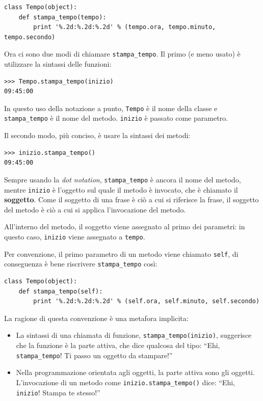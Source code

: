 \documentclass[10pt]{book}
\begin{document}
\begin{verbatim}
class Tempo(object):
    def stampa_tempo(tempo):
        print '%.2d:%.2d:%.2d' % (tempo.ora, tempo.minuto, tempo.secondo)
\end{verbatim}
%
Ora ci sono due modi di chiamare \verb"stampa_tempo".  Il primo (e meno usato) è utilizzare la sintassi delle funzioni:


\begin{verbatim}
>>> Tempo.stampa_tempo(inizio)
09:45:00
\end{verbatim}
%
In questo uso della notazione a punto, {\tt Tempo} è il nome della classe e
 \verb"stampa_tempo" è il nome del metodo.  {\tt inizio} è passato come parametro.

Il secondo modo, più conciso, è usare la sintassi dei metodi:

\begin{verbatim}
>>> inizio.stampa_tempo()
09:45:00
\end{verbatim}
%
Sempre usando la {\em dot notation}, \verb"stampa_tempo" è ancora il nome del metodo, mentre {\tt inizio} è l'oggetto sul quale il metodo è invocato, che è chiamato il {\bf soggetto}.  Come il soggetto di una frase è ciò a cui si riferisce la frase, il soggetto del metodo è ciò a cui si applica l'invocazione del metodo.

All'interno del metodo, il soggetto viene assegnato al primo dei parametri: in questo caso, {\tt inizio} viene assegnato a {\tt tempo}.

Per convenzione, il primo parametro di un metodo viene chiamato {\tt self}, di conseguenza è bene riscrivere \verb"stampa_tempo" così:

\begin{verbatim}
class Tempo(object):
    def stampa_tempo(self):
        print '%.2d:%.2d:%.2d' % (self.ora, self.minuto, self.secondo)
\end{verbatim}
%
La ragione di questa convenzione è una metafora implicita:

\begin{itemize}

\item La sintassi di una chiamata di funzione, \verb"stampa_tempo(inizio)",
  suggerisce che la funzione è la parte attiva, che dice qualcosa del tipo: ``Ehi, \verb"stampa_tempo"!  Ti passo un oggetto da stampare!''

\item Nella programmazione orientata agli oggetti, la parte attiva sono gli oggetti.  L'invocazione di un metodo come \verb"inizio.stampa_tempo()" dice:
  ``Ehi, {\tt inizio}!  Stampa te stesso!''

\end{itemize}
\end{document}

